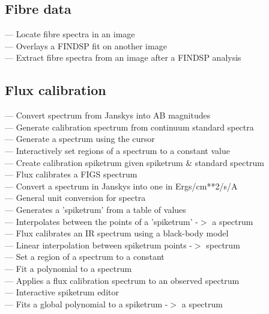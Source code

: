 
\subsection{\label{classiffibres}Fibre data}

 --- Locate fibre spectra in an image\\
 --- Overlays a FINDSP fit on another image\\
 --- Extract fibre spectra from an image after a FINDSP analysis


\subsection{\label{classiffluxing}Flux calibration}

 --- Convert spectrum from Janskys into AB magnitudes\\
 --- Generate calibration spectrum from continuum standard spectra\\
 --- Generate a spectrum using the cursor\\
 --- Interactively set regions of a spectrum to a constant value\\
 --- Create calibration spiketrum given spiketrum \& standard spectrum\\
 --- Flux calibrates a FIGS spectrum\\
 --- Convert a spectrum in Janskys into one in Ergs/cm**2/s/A\\
 --- General unit conversion for spectra\\
 --- Generates a 'spiketrum' from a table of values\\
 --- Interpolates between the points of a 'spiketrum' -$>$ a spectrum\\
 --- Flux calibrates an IR spectrum using a black-body model\\
 --- Linear interpolation between spiketrum points -$>$ spectrum\\
 --- Set a region of a spectrum to a constant\\
 --- Fit a polynomial to a spectrum\\
 --- Applies a flux calibration spectrum to an observed spectrum\\
 --- Interactive spiketrum editor\\
 --- Fits a global polynomial to a spiketrum -$>$ a spectrum

